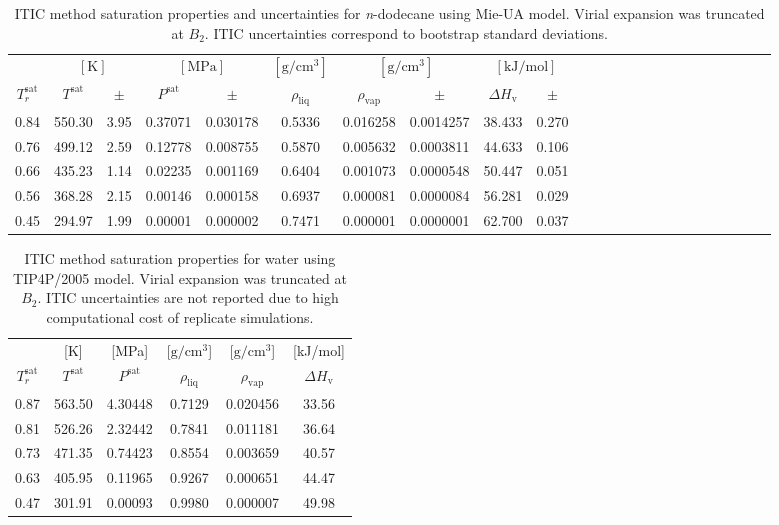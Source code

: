 \documentclass[%
 aip,
 jcp,
 sd,%
 amsmath,amssymb,
 reprint,%
]{revtex4-1}
\begin{document}
\begin{table}[]
\centering
\caption{ITIC method saturation properties and uncertainties for \textit{n}-dodecane using Mie-UA model. Virial expansion was truncated at $B_2$. ITIC uncertainties correspond to bootstrap standard deviations.}
\label{tab:EXAMPLE-SIM/Mie-C12/}
\begin{ruledtabular}
\begin{tabular}{cccccccccccccccccccccccc}
 & \multicolumn{2}{c}{$[\mathrm{K}]$} &	 \multicolumn{2}{c}{$[\mathrm{MPa}]$}	& $[\mathrm{g/cm^3}]$ & \multicolumn{2}{c}{$[\mathrm{g/cm^3}]$} & \multicolumn{2}{c}{$[\mathrm{kJ/mol}]$} \\
$T_r^{\mathrm{sat}}$ & $T^{\mathrm{sat}}$ & $\pm$ & $P^{\mathrm{sat}}$ & $\pm$ & $\rho_{\mathrm{liq}}$ & $\rho_{\mathrm{vap}}$ & $\pm$ & $\Delta H_{\mathrm{v}}$ & $\pm$
 \\
\hline													
0.84	&	550.30	&	3.95	&	0.37071	&	0.030178	&	0.5336	&	0.016258	&	0.0014257	&	38.433	&	0.270	\\
0.76	&	499.12	&	2.59	&	0.12778	&	0.008755	&	0.5870	&	0.005632	&	0.0003811	&	44.633	&	0.106	\\
0.66	&	435.23	&	1.14	&	0.02235	&	0.001169	&	0.6404	&	0.001073	&	0.0000548	&	50.447	&	0.051	\\
0.56	&	368.28	&	2.15	&	0.00146	&	0.000158	&	0.6937	&	0.000081	&	0.0000084	&	56.281	&	0.029	\\
0.45	&	294.97	&	1.99	&	0.00001	&	0.000002	&	0.7471	&	0.000001	&	0.0000001	&	62.700	&	0.037	\\
\end{tabular}
\end{ruledtabular}
\end{table}

\begin{table}[]
\centering
\caption{ITIC method saturation properties for water using TIP4P/2005 model. Virial expansion was truncated at $B_2$. ITIC uncertainties are not reported due to high computational cost of replicate simulations.}
\label{tab:EXAMPLE-SIM/TIP4P-water}
\begin{ruledtabular}
\begin{tabular}{cccccc}
 & {[}K{]} &	 {[}MPa{]} & {[}$\mathrm{g/cm^3}${]} & {[}$\mathrm{g/cm^3}${]}	& {[}kJ/mol{]}  \\
$T_r^{\mathrm{sat}}$ & $T^{\mathrm{sat}}$ & $P^{\mathrm{sat}}$ & $\rho_{\mathrm{liq}}$ & $\rho_{\mathrm{vap}}$ & $\Delta H_{\mathrm{v}}$ \\
\hline													
0.87	&	563.50	&	4.30448	&	0.7129	&	0.020456	&	33.56	\\
0.81	&	526.26	&	2.32442	&	0.7841	&	0.011181	&	36.64	\\
0.73	&	471.35	&	0.74423	&	0.8554	&	0.003659	&	40.57	\\
0.63	&	405.95	&	0.11965	&	0.9267	&	0.000651	&	44.47	\\
0.47	&	301.91	&	0.00093	&	0.9980	&	0.000007	&	49.98	\\
\end{tabular}
\end{ruledtabular}
\end{table}
\end{document}
